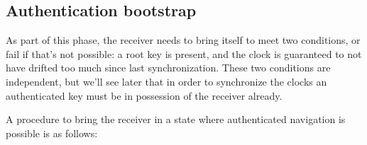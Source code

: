 
\subsection{Authentication bootstrap}
As part of this phase, the receiver needs to bring itself to meet two
conditions, or fail if that's not possible: a root key is present, and the clock
is guaranteed to not have drifted too much since last synchronization. These two
conditions are independent, but we'll see later that in order to synchronize the
clocks an authenticated key must be in possession of the receiver already.

A procedure to bring the receiver in a state where authenticated navigation is
possible is as follows:
